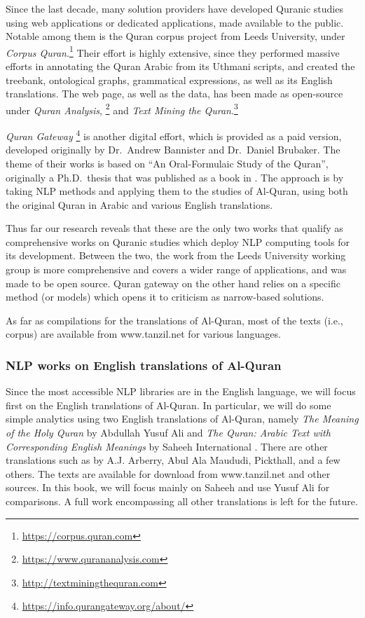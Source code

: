 \documentclass[
]{article}
\begin{document}
Since the last decade, many solution providers have developed Quranic studies using web applications or dedicated applications, made available to the public. Notable among them is the Quran corpus project from Leeds University, under \emph{Corpus Quran}.\footnote{\url{https://corpus.quran.com}} Their effort is highly extensive, since they performed massive efforts in annotating the Quran Arabic from its Uthmani scripts, and created the treebank, ontological graphs, grammatical expressions, as well as its English translations. The web page, as well as the data, has been made as open-source under \emph{Quran Analysis}, \footnote{\url{https://www.qurananalysis.com}} and \emph{Text Mining the Quran}.\footnote{\url{http://textminingthequran.com}}

\emph{Quran Gateway} \footnote{\url{https://info.qurangateway.org/about/}} is another digital effort, which is provided as a paid version, developed originally by Dr.~Andrew Bannister and Dr.~Daniel Brubaker. The theme of their works is based on ``An Oral-Formulaic Study of the Quran'', originally a Ph.D.~thesis that was published as a book in \citep{bannister2014}. The approach is by taking NLP methods and applying them to the studies of Al-Quran, using both the original Quran in Arabic and various English translations.

Thus far our research reveals that these are the only two works that qualify as comprehensive works on Quranic studies which deploy NLP computing tools for its development. Between the two, the work from the Leeds University working group is more comprehensive and covers a wider range of applications, and was made to be open source. Quran gateway on the other hand relies on a specific method (or models) which opens it to criticism as narrow-based solutions.

As far as compilations for the translations of Al-Quran, most of the texts (i.e., corpus) are available from www.tanzil.net for various languages.

\hypertarget{nlp-works-on-english-translations-of-al-quran}{%
\subsubsection{NLP works on English translations of Al-Quran}\label{nlp-works-on-english-translations-of-al-quran}}

Since the most accessible NLP libraries are in the English language, we will focus first on the English translations of Al-Quran. In particular, we will do some simple analytics using two English translations of Al-Quran, namely \emph{The Meaning of the Holy Quran} by Abdullah Yusuf Ali \citep{yusufali2003} and \emph{The Quran: Arabic Text with Corresponding English Meanings} by Saheeh International \citep{saheeh1997}. There are other translations such as by A.J. Arberry, Abul Ala Maududi, Pickthall, and a few others. The texts are available for download from www.tanzil.net and other sources. In this book, we will focus mainly on Saheeh and use Yusuf Ali for comparisons. A full work encompassing all other translations is left for the future.
\end{document}

